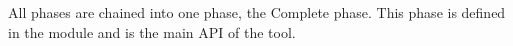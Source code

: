 All phases are chained into one phase, the Complete phase. This phase is defined
in the  module and is the main API of the tool.









